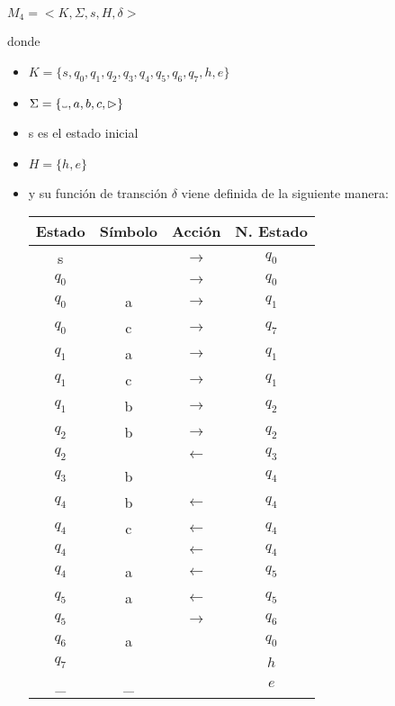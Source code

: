 \documentclass[11pt, a4paper, titlepage]{article}
\newcommand\vartextvisiblespace[1][.5em]{%
  \makebox[#1]{%
    \kern.07em
    \vrule height.3ex
    \hrulefill
    \vrule height.3ex
    \kern.07em
  }%
}
\begin{document}
$ M_4 = < K, \Sigma, s, H, \delta >$

donde
\begin{itemize}
\item $ K = \{ s, q_0, q_1, q_2, q_3, q_4, q_5, q_6, q_7, h, e \}$
\item $ \Sigma = \{\vartextvisiblespace, a, b, c, \rhd \}$
\item s es el estado inicial
\item $ H = \{ h, e \}$
\item y su función de transción $\delta$ viene definida de la siguiente manera:
  \begin{center}
    \begin{tabular}{|| c c c c ||}
      \hline
      Estado & Símbolo & Acción & N. Estado \\ [0.5ex]
      \hline\hline
      s & \vartextvisiblespace & $\rightarrow$ & $q_0$ \\
      \hline
      $q_0$ & \vartextvisiblespace & $\rightarrow$ & $q_0$ \\
      \hline
      $q_0$ & a & $\rightarrow$ & $q_1$ \\
      \hline
      $q_0$ & c & $\rightarrow$ & $q_7$ \\
      \hline
      $q_1$ & a & $\rightarrow$ & $q_1$ \\
      \hline
      $q_1$ & c & $\rightarrow$ & $q_1$ \\
      \hline
      $q_1$ & b & $\rightarrow$ & $q_2$ \\
      \hline
      $q_2$ & b & $\rightarrow$ & $q_2$ \\
      \hline
      $q_2$ & \vartextvisiblespace & $\leftarrow$ & $q_3$ \\
      \hline
      $q_3$ & b & \vartextvisiblespace & $q_4$ \\
      \hline
      $q_4$ & b & $\leftarrow$ & $q_4$ \\
      \hline
      $q_4$ & c & $\leftarrow$ & $q_4$ \\
      \hline
      $q_4$ & \vartextvisiblespace & $\leftarrow$ & $q_4$ \\
      \hline
      $q_4$ & a & $\leftarrow$ & $q_5$ \\
      \hline
      $q_5$ & a & $\leftarrow$ & $q_5$ \\
      \hline
      $q_5$ & \vartextvisiblespace & $\rightarrow$ & $q_6$ \\
      \hline
      $q_6$ & a & \vartextvisiblespace & $q_0$ \\
      \hline
      $q_7$ & \vartextvisiblespace & \vartextvisiblespace & $h$ \\
      \hline
      \_ & \_ & \vartextvisiblespace & $e$ \\
      \hline
    \end{tabular}
\end{center}
\end{itemize}
\end{document}
